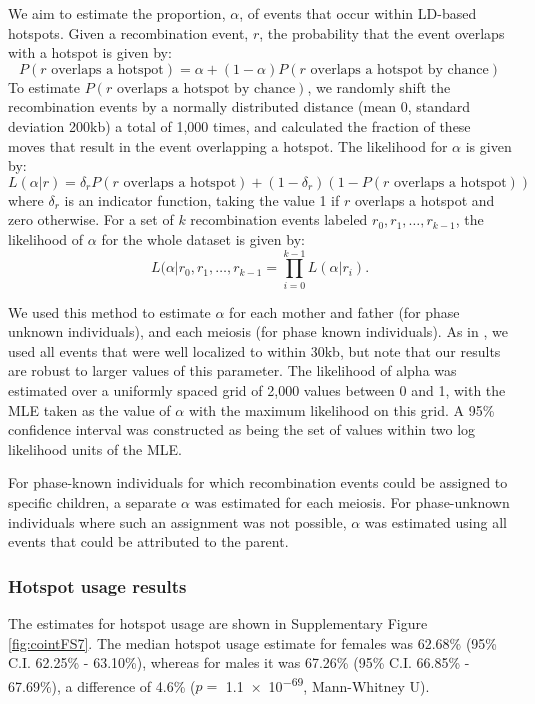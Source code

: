 We aim to estimate the proportion, $\alpha$, of events that occur within LD-based  
hotspots. Given a recombination event, $r$, the probability that the event overlaps  
with a hotspot is given by:  
\[
    P ( r \text{ overlaps a hotspot} ) = \alpha + (1-\alpha) P(r \text{ overlaps a hotspot by chance} )
\]
To estimate $P(r \text{ overlaps a hotspot by chance})$, we randomly shift the  
recombination events by a normally distributed distance (mean 0, standard  
deviation 200kb) a total of 1,000 times, and calculated the fraction of these moves  
that result in the event overlapping a hotspot. The likelihood for $\alpha$ is given by:  
\[
    L(\alpha|r) = \delta_r P( r \text{ overlaps a hotspot} ) + (1 - \delta_r)( 1 - P( r \text{ overlaps a hotspot}) )
\]
where $\delta_r$ is an indicator function, taking the value 1 if $r$ overlaps a hotspot and zero  
otherwise. For a set of $k$ recombination events labeled $r_0,r_1,\dots,r_{k-1}$, the likelihood  
of $\alpha$ for the whole dataset is given by:  
\begin{equation}
    L(\alpha|r_0,r_1,\dots,r_{k-1} = \prod_{i=0}^{k-1} L(\alpha|r_i) .
\end{equation}

We used this method to estimate $\alpha$ for each mother and father (for phase
unknown individuals), and each meiosis (for phase known individuals). As in \citet{Coop2008},
we used all events that were well localized to within 30kb, but note that our  
results are robust to larger values of this parameter. The likelihood of alpha was  
estimated over a uniformly spaced grid of 2,000 values between 0 and 1, with the  
MLE taken as the value of $\alpha$ with the maximum likelihood on this grid. A 95\%  
confidence interval was constructed as being the set of values within two log  
likelihood units of the MLE.    

For phase-known individuals for which recombination events could be  
assigned to specific children, a separate $\alpha$ was estimated for each meiosis. For  
phase-unknown individuals where such an assignment was not possible, $\alpha$ was  
estimated using all events that could be attributed to the parent.  


\subsubsection{Hotspot usage results} %
 
The estimates for hotspot usage are shown in Supplementary Figure \ref{fig:cointFS7}. 
The  median hotspot usage estimate for females was 62.68\% (95\% C.I. 62.25\% - 63.10\%),
whereas for males it was 67.26\% (95\% C.I. 66.85\% - 67.69\%), a difference of 4.6\%  
($p=$ \num{1.1e-69}, Mann-Whitney U).  

